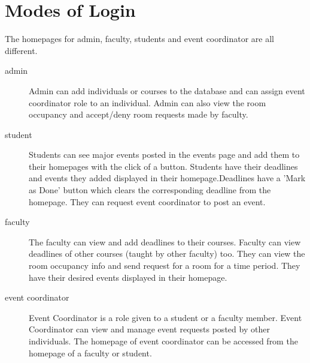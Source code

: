 \documentclass[12pt]{article}
\begin{document}
\section{Modes of Login}
The homepages for admin, faculty, students and event coordinator are all different. 
\begin{description}

    \item[admin] Admin can add individuals or courses to the database and can assign event coordinator role to an individual. Admin can also view the room occupancy and accept/deny room requests made by faculty.
    \item [student] Students can see major events posted in the events page and add them to their homepages with the click of a button. Students have their deadlines and events they added displayed in their homepage.Deadlines have a 'Mark as Done' button which clears the corresponding deadline from the homepage. They can request event coordinator to post an event.
    \item [faculty] The faculty can view and add deadlines to their courses. Faculty can view deadlines of other courses (taught by other faculty) too. They can view the room occupancy info and send request for a room for a time period. They have their desired events displayed in their homepage.
    \item [event coordinator] Event Coordinator is a role given to a student or a faculty member. Event Coordinator can view and manage event requests posted by other individuals. The homepage of event coordinator can be accessed from the homepage of a faculty or student.
\end{description}
\end{document}
